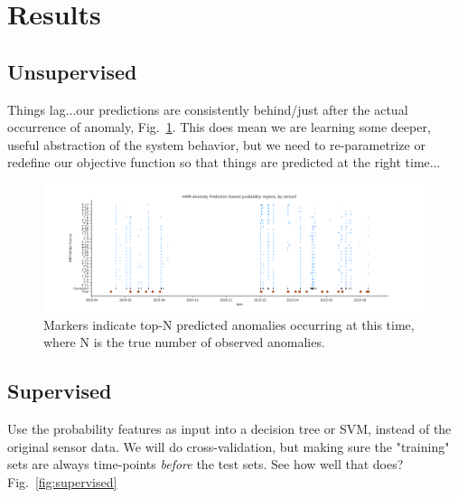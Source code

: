 \documentclass[twocolumn,10pt]{article}
\begin{document}
\section{Results}

\subsection{Unsupervised}
Things lag...our predictions are consistently behind/just after the actual occurrence of anomaly, Fig.~\ref{fig:unsupervised}. This does mean we are learning some deeper, useful abstraction of the system behavior, but we need to re-parametrize or redefine our objective function so that things are predicted at the right time...
\begin{figure}
    \centering
    \includegraphics[width=\linewidth]{unsupervised.png}
    \caption{Markers indicate top-N predicted anomalies occurring at this time, where N is the true number of observed anomalies. }
    \label{fig:unsupervised}
\end{figure}

\subsection{Supervised}
Use the probability features as input into a decision tree or SVM, instead of the original sensor data. We will do cross-validation, but making sure the "training" sets are always time-points \textit{before} the test sets. See how well that does? Fig.~\ref{fig:supervised} 
\end{document}
